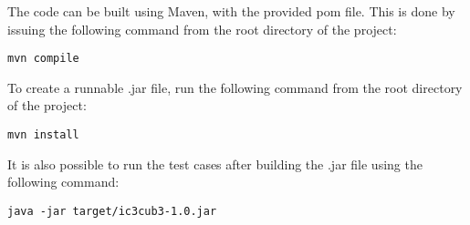 \documentclass[a4paper]{article}
\begin{document}
The code can be built using Maven, with the provided pom file. This is done by issuing the following command from the root directory of the project:

\texttt{mvn compile}

To create a runnable .jar file, run the following command from the root directory of the project:

\texttt{mvn install}

It is also possible to run the test cases after building the .jar file using the following command:

\texttt{java -jar target/ic3cub3-1.0.jar}
\end{document}
